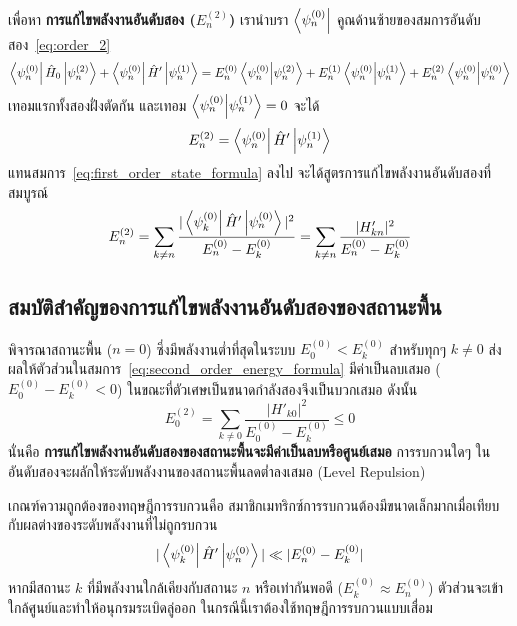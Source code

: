 เพื่อหา \textbf{การแก้ไขพลังงานอันดับสอง ($E_n^{(2)}$)} เรานำบรา $\bra{\psi_n^{(0)}}$ คูณด้านซ้ายของสมการอันดับสอง~\eqref{eq:order_2}
\begin{equation}
\bra{\psi_n^{(0)}} \hat{H}_0 \ket{\psi_n^{(2)}} + \bra{\psi_n^{(0)}} \hat{H}' \ket{\psi_n^{(1)}} = E_n^{(0)} \braket{\psi_n^{(0)}}{\psi_n^{(2)}} + E_n^{(1)} \braket{\psi_n^{(0)}}{\psi_n^{(1)}} + E_n^{(2)} \braket{\psi_n^{(0)}}{\psi_n^{(0)}}
\end{equation}
เทอมแรกทั้งสองฝั่งตัดกัน และเทอม $\braket{\psi_n^{(0)}}{\psi_n^{(1)}} = 0$ จะได้
\begin{equation}
E_n^{(2)} = \bra{\psi_n^{(0)}} \hat{H}' \ket{\psi_n^{(1)}}
\end{equation}
แทนสมการ~\eqref{eq:first_order_state_formula} ลงไป จะได้สูตรการแก้ไขพลังงานอันดับสองที่สมบูรณ์
\begin{equation}
E_n^{(2)} = \sum_{k \neq n} \frac{|\bra{\psi_k^{(0)}} \hat{H}' \ket{\psi_n^{(0)}}|^2}{E_n^{(0)} - E_k^{(0)}} = \sum_{k \neq n} \frac{|H'_{kn}|^2}{E_n^{(0)} - E_k^{(0)}}
\label{eq:second_order_energy_formula}
\end{equation}

\subsection{สมบัติสำคัญของการแก้ไขพลังงานอันดับสองของสถานะพื้น}
พิจารณาสถานะพื้น ($n = 0$) ซึ่งมีพลังงานต่ำที่สุดในระบบ $E_0^{(0)} < E_k^{(0)}$ สำหรับทุกๆ $k \neq 0$
ส่งผลให้ตัวส่วนในสมการ~\eqref{eq:second_order_energy_formula} มีค่าเป็นลบเสมอ ($E_0^{(0)} - E_k^{(0)} < 0$) ในขณะที่ตัวเศษเป็นขนาดกำลังสองจึงเป็นบวกเสมอ ดังนั้น
\begin{equation}
E_0^{(2)} = \sum_{k \neq 0} \frac{|H'_{k0}|^2}{E_0^{(0)} - E_k^{(0)}} \le 0
\label{eq:ground_state_second_order_negative}
\end{equation}
นั่นคือ \textbf{การแก้ไขพลังงานอันดับสองของสถานะพื้นจะมีค่าเป็นลบหรือศูนย์เสมอ} การรบกวนใดๆ ในอันดับสองจะผลักให้ระดับพลังงานของสถานะพื้นลดต่ำลงเสมอ (Level Repulsion)

เกณฑ์ความถูกต้องของทฤษฎีการรบกวนคือ สมาชิกเมทริกซ์การรบกวนต้องมีขนาดเล็กมากเมื่อเทียบกับผลต่างของระดับพลังงานที่ไม่ถูกรบกวน
\begin{equation}
|\bra{\psi_k^{(0)}} \hat{H}' \ket{\psi_n^{(0)}}| \ll |E_n^{(0)} - E_k^{(0)}|
\end{equation}
หากมีสถานะ $k$ ที่มีพลังงานใกล้เคียงกับสถานะ $n$ หรือเท่ากันพอดี ($E_k^{(0)} \approx E_n^{(0)}$) ตัวส่วนจะเข้าใกล้ศูนย์และทำให้อนุกรมระเบิดลู่ออก ในกรณีนี้เราต้องใช้ทฤษฎีการรบกวนแบบเสื่อม

